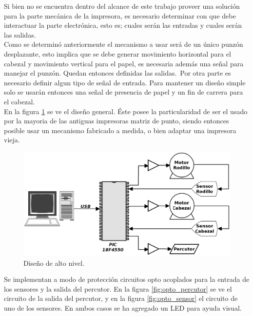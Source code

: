 Si bien no se encuentra dentro del alcance de este trabajo proveer una
soluci\'on para la parte mec\'anica de la impresora, es necesario determinar
con que debe interactuar la parte electr\'onica, esto es; cuales ser\'an las
entradas y cuales ser\'an las salidas.\\

Como se determin\'o anteriormente el mecanismo a usar ser\'a de un \'unico
punz\'on desplazante, esto implica que se debe generar movimiento horizontal
para el cabezal y movimiento vertical para el papel, es necesaria adem\'as una
se\~nal para manejar el punz\'on. Quedan entonces definidas las salidas.\
Por otra parte es necesario definir algun tipo de se\~nal de entrada. Para
mantener un dise\~no simple solo se usar\'an entonces una se\~nal de presencia
de papel y un fin de carrera para el cabezal.\\

En la figura \ref{fig:pc_uc_motors} se ve el dise\~no general. \'Este posee la
particularidad de ser el usado por la mayoria de las antiguas impresoras
matriz de punto, siendo entonces posible usar un mecanismo fabricado a medida,
o bien adaptar una impresora vieja.


\begin{figure}[htp]
\centering
\includegraphics[width=13cm]{./img/pc_uc_motors.png}
\caption{Dise\~no de alto nivel.}
\label{fig:pc_uc_motors}
\end{figure}

Se implementan a modo de protecci\'on circuitos opto acoplados para la
entrada de los sensores y la salida del percutor. En la figura
\ref{fig:opto_percutor} se ve el circuito de la salida del percutor, y en la
figura \ref{fig:opto_sensor} el circuito de uno de los sensores. En ambos
casos se ha agregado un LED para ayuda visual.\\

